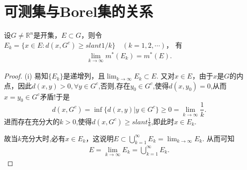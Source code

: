 \documentclass[../../main.tex]{subfiles}
\begin{document}
\section{可测集与Borel集的关系}

\begin{lemma}[Carathéodory引理]\label{lemma:卡拉西奥多里引理}
设$G\neq\mathbb{R}^n$是开集，$E\subset G$，则令
$E_k = \{x\in E:d(x,G^c)\geqslant slant 1/k\}\quad (k = 1,2,\cdots)$，
有
\begin{align*}
\lim_{k\to\infty}m^*(E_k)=m^*(E).
\end{align*}
\end{lemma}
\begin{proof}
(i) 易知$\{E_k\}$是递增列，且$\lim_{k\to\infty}E_k\subset E$. 又对$x\in E$，由于$x$是$G$的内点，因此$d(x,y)>0,\forall y\in G^c$,否则,存在$y_0\in G^c$,使得$d(x,y_0)=0$,从而$x=y_0\in G^c$矛盾!于是$$d(x,G^c)=\inf\{d(x,y)|y\in G^c\} \geqslant  0=\lim_{k\to \infty}\frac{1}{k}.$$
进而存在充分大的$k>0$,使得$d(x,G^c)\geqslant slant \frac{1}{k}$,即此时$x\in E_k$.

故当$k$充分大时,必有$x\in E_k$，这说明$E\subset\bigcup_{k = 1}^{\infty}E_k=\lim_{k\to\infty}E_k$. 从而可知
\begin{align*}
E=\lim_{k\to\infty}E_k=\bigcup_{k = 1}^{\infty}E_k.
\end{align*}


\end{proof}
\end{document}
